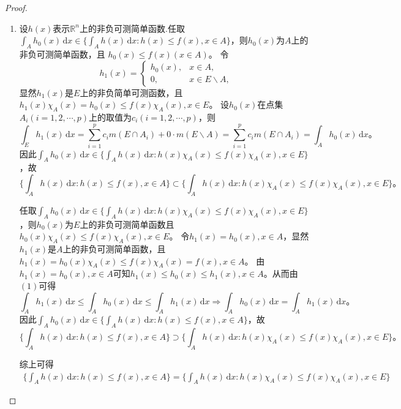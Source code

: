 \documentclass[../../main.tex]{subfiles}%
\begin{document}
\begin{proof}
\begin{enumerate}[(1)]
\item 设$h(x)$表示$\mathbb{R}^n$上的非负可测简单函数.任取$\int_A h_0(x)\,\mathrm{d}x \in \{\int_A h(x)\,\mathrm{d}x : h(x) \leqslant f(x), x \in A\}$，则$h_0(x)$为$A$上的非负可测简单函数，且
$h_0(x) \leqslant f(x) (x\in A)$。
令
\[
h_1(x) = 
\begin{cases} 
h_0(x), & x \in A, \\
0, & x \in E\backslash A,
\end{cases}
\]
显然$h_1(x)$是$E$上的非负简单可测函数，且
$h_1(x) \chi_A(x) = h_0(x) \leqslant f(x) \chi_A(x), x \in E$。
设$h_0(x)$在点集$A_i (i = 1,2,\cdots,p)$上的取值为$c_i (i = 1,2,\cdots,p)$，则
\[
\int_E h_1(x)\,\mathrm{d}x = \sum_{i=1}^p c_i m(E \cap A_i) + 0 \cdot m(E\backslash A) = \sum_{i=1}^p c_i m(E \cap A_i) = \int_A h_0(x)\,\mathrm{d}x。
\]
因此$\int_A h_0(x)\,\mathrm{d}x \in \{\int_A h(x)\,\mathrm{d}x : h(x) \chi_A(x) \leqslant f(x) \chi_A(x), x \in E\}$，故
\[
\{\int_A h(x)\,\mathrm{d}x : h(x) \leqslant f(x), x \in A\} \subset \{\int_A h(x)\,\mathrm{d}x : h(x) \chi_A(x) \leqslant f(x) \chi_A(x), x \in E\}。
\]

任取$\int_A h_0(x)\,\mathrm{d}x \in \{\int_A h(x)\,\mathrm{d}x : h(x) \chi_A(x) \leqslant f(x) \chi_A(x), x \in E\}$，则$h_0(x)$为$E$上的非负可测简单函数且
$h_0(x) \chi_A(x) \leqslant f(x) \chi_A(x), x \in E$。
令$h_1(x) = h_0(x), x \in A$，显然$h_1(x)$是$A$上的非负可测简单函数，且
$h_1(x) = h_0(x) \chi_A(x) \leqslant f(x) \chi_A(x) = f(x), x \in A$。
由$h_1(x) = h_0(x), x \in A$可知$h_1(x) \leqslant h_0(x) \leqslant h_1(x), x \in A$。从而由$(1)$可得
\[
\int_A h_1(x)\,\mathrm{d}x \leqslant \int_A h_0(x)\,\mathrm{d}x \leqslant \int_A h_1(x)\,\mathrm{d}x \Rightarrow \int_A h_0(x)\,\mathrm{d}x = \int_A h_1(x)\,\mathrm{d}x。
\]
因此$\int_A h_0(x)\,\mathrm{d}x \in \{\int_A h(x)\,\mathrm{d}x : h(x) \leqslant f(x), x \in A\}$，故
\[
\{\int_A h(x)\,\mathrm{d}x : h(x) \leqslant f(x), x \in A\} \supset \{\int_A h(x)\,\mathrm{d}x : h(x) \chi_A(x) \leqslant f(x) \chi_A(x), x \in E\}。
\]

综上可得
\begin{align}
\{\int_A h(x)\,\mathrm{d}x : h(x) \leqslant f(x), x \in A\} = \{\int_A h(x)\,\mathrm{d}x : h(x) \chi_A(x) \leqslant f(x) \chi_A(x), x \in E\}\label{equation:100.79}
\end{align}


\end{enumerate}
\end{proof}
\end{document}
